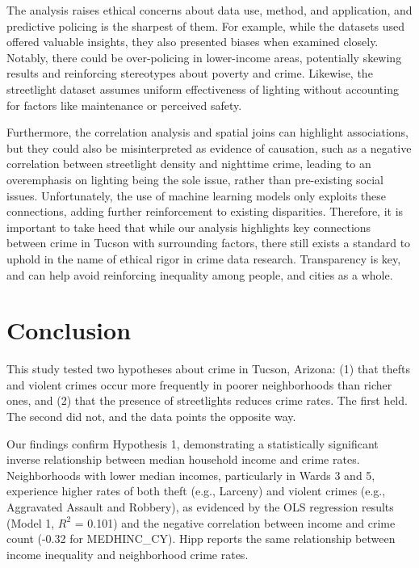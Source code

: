 \documentclass{report}
\begin{document}
\par The analysis raises ethical concerns about data use, method, and application, and predictive policing is the sharpest of them. For example, while the datasets used offered valuable insights, they also presented biases when examined closely. Notably, there could be over-policing in lower-income areas, potentially skewing results and reinforcing stereotypes about poverty and crime. Likewise, the streetlight dataset assumes uniform effectiveness of lighting without accounting for factors like maintenance or perceived safety.

\par Furthermore, the correlation analysis and spatial joins can highlight associations, but they could also be misinterpreted as evidence of causation, such as a negative correlation between streetlight density and nighttime crime, leading to an overemphasis on lighting being the sole issue, rather than pre-existing social issues. Unfortunately, the use of machine learning models only exploits these connections, adding further reinforcement to existing disparities. Therefore, it is important to take heed that while our analysis highlights key connections between crime in Tucson with surrounding factors, there still exists a standard to uphold in the name of ethical rigor in crime data research. Transparency is key, and can help avoid reinforcing inequality among people, and cities as a whole.

\chapter{Conclusion}

\par This study tested two hypotheses about crime in Tucson, Arizona: (1) that thefts and violent crimes occur more frequently in poorer neighborhoods than richer ones, and (2) that the presence of streetlights reduces crime rates. The first held. The second did not, and the data points the opposite way.

\par Our findings confirm Hypothesis 1, demonstrating a statistically significant inverse relationship between median household income and crime rates. Neighborhoods with lower median incomes, particularly in Wards 3 and 5, experience higher rates of both theft (e.g., Larceny) and violent crimes (e.g., Aggravated Assault and Robbery), as evidenced by the OLS regression results (Model 1, $R^2$ = 0.101) and the negative correlation between income and crime count (-0.32 for MEDHINC\_CY). Hipp \cite{jr07} reports the same relationship between income inequality and neighborhood crime rates.
\end{document}
